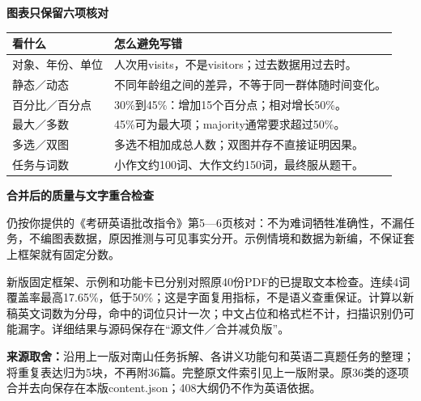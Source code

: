 \documentclass[11pt,a4paper,fontset=macnew]{ctexart}
\begin{document}
\par\vspace{5pt}\noindent\textbf{图表只保留六项核对}\par\nopagebreak
{\small
\begin{longtable}{L{32mm}L{125mm}}\toprule
\textbf{看什么} & \textbf{怎么避免写错}\\\midrule\endhead
对象、年份、单位 & 人次用visits，不是visitors；过去数据用过去时。\\
静态／动态 & 不同年龄组之间的差异，不等于同一群体随时间变化。\\
百分比／百分点 & 30\%到45\%：增加15个百分点；相对增长50\%。\\
最大／多数 & 45\%可为最大项；majority通常要求超过50\%。\\
多选／双图 & 多选不相加成总人数；双图并存不直接证明因果。\\
任务与词数 & 小作文约100词、大作文约150词，最终服从题干。\\
\bottomrule\end{longtable}
}
\par\vspace{5pt}\noindent\textbf{合并后的质量与文字重合检查}\par\nopagebreak
仍按你提供的《考研英语批改指令》第5—6页核对：不为难词牺牲准确性，不漏任务，不编图表数据，原因推测与可见事实分开。示例情境和数据为新编，不保证套上框架就有固定分数。

新版固定框架、示例和功能卡已分别对照原40份PDF的已提取文本检查。连续4词覆盖率最高17.65\%，低于50\%；这是字面复用指标，不是语义查重保证。计算以新稿英文词数为分母，命中的词位只计一次；中文占位和格式栏不计，扫描识别仍可能漏字。详细结果与源码保存在“源文件／合并减负版”。

{\small\textbf{来源取舍：}沿用上一版对南山任务拆解、各讲义功能句和英语二真题任务的整理；将重复表达归为5块，不再附36篇。完整原文件索引见上一版附录。原36类的逐项合并去向保存在本版content.json；408大纲仍不作为英语依据。}\par
\end{document}
